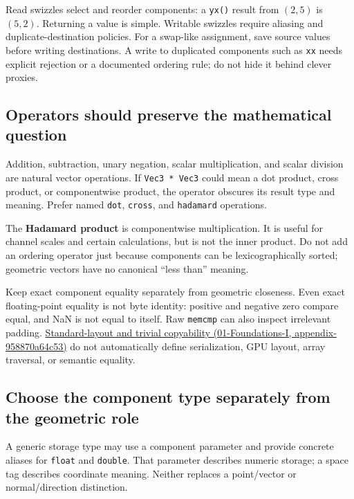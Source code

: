 Read swizzles select and reorder components: a \texttt{yx()} result from \((2,5)\) is \((5,2)\). Returning a value is simple. Writable swizzles require aliasing and duplicate-destination policies. For a swap-like assignment, save source values before writing destinations. A write to duplicated components such as \texttt{xx} needs explicit rejection or a documented ordering rule; do not hide it behind clever proxies.

\subsection{Operators should preserve the mathematical question}\label{02-foundations-ii-ch037-operators-should-preserve-the-mathematical-question}

Addition, subtraction, unary negation, scalar multiplication, and scalar division are natural vector operations. If \texttt{Vec3\ *\ Vec3} could mean a dot product, cross product, or componentwise product, the operator obscures its result type and meaning. Prefer named \texttt{dot}, \texttt{cross}, and \texttt{hadamard} operations.

The \textbf{Hadamard product} is componentwise multiplication. It is useful for channel scales and certain calculations, but is not the inner product. Do not add an ordering operator just because components can be lexicographically sorted; geometric vectors have no canonical ``less than'' meaning.

Keep exact component equality separately from geometric closeness. Even exact floating-point equality is not byte identity: positive and negative zero compare equal, and NaN is not equal to itself. Raw \texttt{memcmp} can also inspect irrelevant padding. \href{../01-Foundations-I/main.pdf\#nameddest=appendix-958870a64c53}{Standard-layout and trivial copyability (01-Foundations-I, appendix-958870a64c53)} do not automatically define serialization, GPU layout, array traversal, or semantic equality.

\subsection{Choose the component type separately from the geometric role}\label{02-foundations-ii-ch037-choose-the-component-type-separately-from-the-geometric-role}

A generic storage type may use a component parameter and provide concrete aliases for \texttt{float} and \texttt{double}. That parameter describes numeric storage; a space tag describes coordinate meaning. Neither replaces a point/vector or normal/direction distinction.

